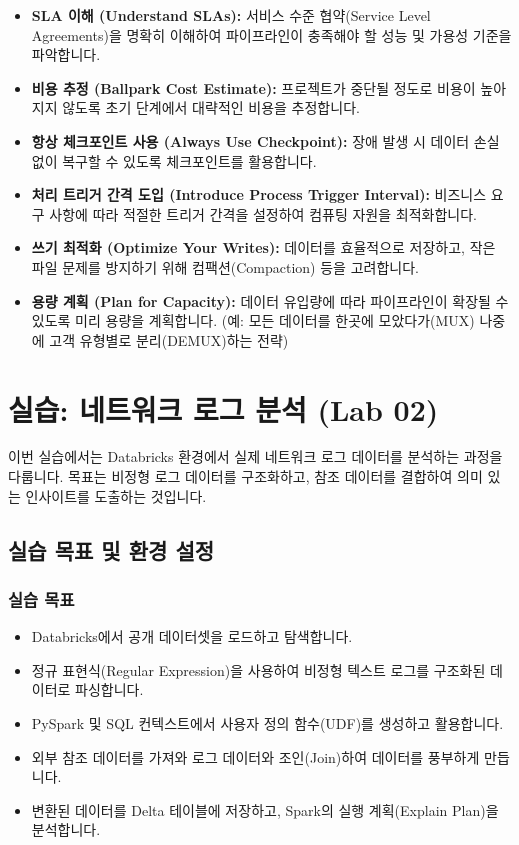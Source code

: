 \documentclass[11pt,a4paper]{article}
\begin{document}
\begin{itemize}
    \item \textbf{SLA 이해 (Understand SLAs):} 서비스 수준 협약(Service Level Agreements)을 명확히 이해하여 파이프라인이 충족해야 할 성능 및 가용성 기준을 파악합니다.
    \item \textbf{비용 추정 (Ballpark Cost Estimate):} 프로젝트가 중단될 정도로 비용이 높아지지 않도록 초기 단계에서 대략적인 비용을 추정합니다.
    \item \textbf{항상 체크포인트 사용 (Always Use Checkpoint):} 장애 발생 시 데이터 손실 없이 복구할 수 있도록 체크포인트를 활용합니다.
    \item \textbf{처리 트리거 간격 도입 (Introduce Process Trigger Interval):} 비즈니스 요구 사항에 따라 적절한 트리거 간격을 설정하여 컴퓨팅 자원을 최적화합니다.
    \item \textbf{쓰기 최적화 (Optimize Your Writes):} 데이터를 효율적으로 저장하고, 작은 파일 문제를 방지하기 위해 컴팩션(Compaction) 등을 고려합니다.
    \item \textbf{용량 계획 (Plan for Capacity):} 데이터 유입량에 따라 파이프라인이 확장될 수 있도록 미리 용량을 계획합니다. (예: 모든 데이터를 한곳에 모았다가(MUX) 나중에 고객 유형별로 분리(DEMUX)하는 전략)
\end{itemize}

\newpage
\section{실습: 네트워크 로그 분석 (Lab 02)}

이번 실습에서는 Databricks 환경에서 실제 네트워크 로그 데이터를 분석하는 과정을 다룹니다.
목표는 비정형 로그 데이터를 구조화하고, 참조 데이터를 결합하여 의미 있는 인사이트를 도출하는 것입니다.

\subsection{실습 목표 및 환경 설정}

\subsubsection{실습 목표}
\begin{itemize}
    \item Databricks에서 공개 데이터셋을 로드하고 탐색합니다.
    \item 정규 표현식(Regular Expression)을 사용하여 비정형 텍스트 로그를 구조화된 데이터로 파싱합니다.
    \item PySpark 및 SQL 컨텍스트에서 사용자 정의 함수(UDF)를 생성하고 활용합니다.
    \item 외부 참조 데이터를 가져와 로그 데이터와 조인(Join)하여 데이터를 풍부하게 만듭니다.
    \item 변환된 데이터를 Delta 테이블에 저장하고, Spark의 실행 계획(Explain Plan)을 분석합니다.
\end{itemize}
\end{document}
